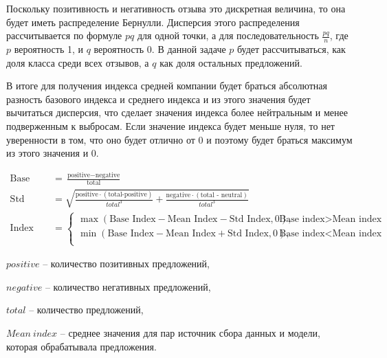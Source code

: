 \documentclass[PI, VKR]{HSEUniversity}
\begin{document}
Поскольку позитивность и негативность отзыва это дискретная величина, то она будет иметь распределение Бернулли\autocite{_encyclopaedia_}. Дисперсия этого распределения рассчитывается по формуле \(pq\) для одной точки, а для последовательность \(\frac{pq}{n}\), где \(p\) вероятность 1, и \(q\) вероятность 0. В данной задаче \(p\) будет рассчитываться, как доля класса среди всех отзывов, а \(q\) как доля остальных предложений.

В итоге для получения индекса средней компании будет браться абсолютная разность базового индекса и среднего индекса и из этого значения будет вычитаться дисперсия, что сделает значения индекса более нейтральным и менее подверженным к выбросам. Если значение индекса будет меньше нуля, то нет уверенности в том, что оно будет отлично от 0 и поэтому будет браться максимум из этого значения и 0.

\begin{equation}
\label{eq:ethics}
\begin{aligned}
    \text{Base index} &= \frac{\text{positive} - \text{negative}}{\text{total}} \\
    \text{Std index} &= \sqrt{\frac{\text{positive}\cdot(\text{total-positive})}{total^{3}} + \frac{\text{negative}\cdot(\text{total - neutral})}{total^{3}}} \\
    \text{Index} &=
        \begin{cases}
            \max(\text{Base Index}-\text{Mean Index}-\text{Std Index},0), & \text{Base index} > \text{Mean index} \\
            \min(\text{Base Index}-\text{Mean Index}+\text{Std Index},0), & \text{Base index} < \text{Mean index} \\
        \end{cases}
\end{aligned}
\end{equation}


\(positive\) -- количество позитивных предложений,

\(negative\) -- количество негативных предложений,

\(total\) -- количество предложений,

\(Mean\ index\) -- среднее значения для пар источник сбора данных и модели, которая обрабатывала предложения.
\end{document}

